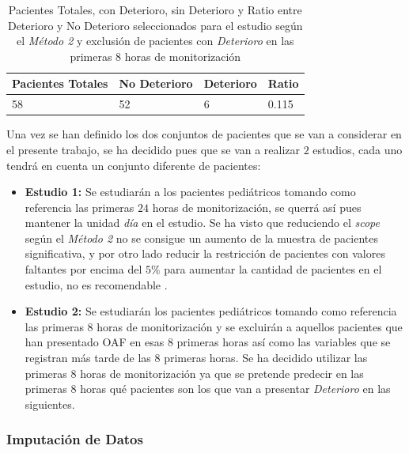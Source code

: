 \begin{itemize}
\begin{table}[H]
        \centering
        \begin{tabular}{|m{3cm}|m{2.25cm}|m{2cm}|m{2cm}|}
        \hline
            Pacientes Totales & No Deterioro & Deterioro & Ratio \\ \hline
            58 & 52 & 6 & 0.115 \\ \hline
        \end{tabular}
        \caption{Pacientes Totales, con Deterioro, sin Deterioro y Ratio entre Deterioro y No Deterioro seleccionados para el estudio según el \textit{Método 2} y exclusión de pacientes con \textit{Deterioro} en las primeras 8 horas de monitorización}
            \label{tabla:ratio-deterioro-P1}
    \end{table}
\end{itemize}

Una vez se han definido los dos conjuntos de pacientes que se van a considerar en el presente trabajo, se ha decidido pues que se van a realizar $2$ estudios, cada uno tendrá en cuenta un conjunto diferente de pacientes:

\begin{itemize}
    \item \textbf{Estudio 1:} Se estudiarán a los pacientes pediátricos tomando como referencia las primeras $24$ horas de monitorización, se querrá así pues mantener la unidad \textit{día} en el estudio. Se ha visto que reduciendo el \textit{scope} según el \textit{Método 2} no se consigue un aumento de la muestra de pacientes significativa, y por otro lado reducir la restricción de pacientes con valores faltantes por encima del $5\%$ para aumentar la cantidad de pacientes en el estudio, no es recomendable \cite{Scheffer2002}.
    \item \textbf{Estudio 2:} Se estudiarán los pacientes pediátricos tomando como referencia las primeras $8$ horas de monitorización y se excluirán a aquellos pacientes que han presentado OAF en esas 8 primeras horas así como las variables que se registran más tarde de las $8$ primeras horas. Se ha decidido utilizar las primeras $8$ horas de monitorización ya que se pretende predecir en las primeras $8$ horas qué pacientes son los que van a presentar \textit{Deterioro} en las siguientes.
\end{itemize}

\newpage
\subsubsection{Imputación de Datos}\label{sec:imputacion-de-datos}

